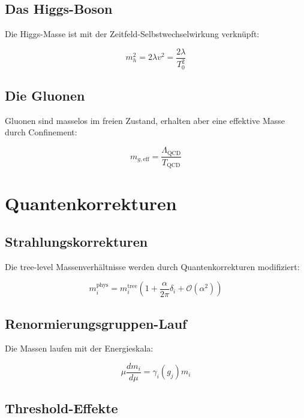 \documentclass[12pt,a4paper]{report}
\begin{document}
	\subsection{Das Higgs-Boson}
	
	Die Higgs-Masse ist mit der Zeitfeld-Selbstwechselwirkung verknüpft:
	
	\begin{equation}
		m_h^2 = 2\lambda v^2 = \frac{2\lambda}{T_0^2}
	\end{equation}
	
	\subsection{Die Gluonen}
	
	Gluonen sind masselos im freien Zustand, erhalten aber eine effektive Masse durch Confinement:
	
	\begin{equation}
		m_{g,\text{eff}} = \frac{\Lambda_{\text{QCD}}}{T_{\text{QCD}}}
	\end{equation}
	
	\section{Quantenkorrekturen}
	
	\subsection{Strahlungskorrekturen}
	
	Die tree-level Massenverhältnisse werden durch Quantenkorrekturen modifiziert:
	
	\begin{equation}
		m_i^{\text{phys}} = m_i^{\text{tree}}\left(1 + \frac{\alpha}{2\pi}\delta_i + \mathcal{O}(\alpha^2)\right)
	\end{equation}
	
	\subsection{Renormierungsgruppen-Lauf}
	
	Die Massen laufen mit der Energieskala:
	
	\begin{equation}
		\mu\frac{dm_i}{d\mu} = \gamma_i(g_j) m_i
	\end{equation}
	
	\subsection{Threshold-Effekte}
	
\end{document}
